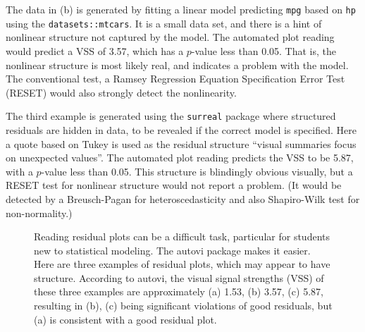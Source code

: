 \documentclass[
doublespace,
  times]{anzsauth}
\begin{document}
The data in (b) is generated by fitting a linear model predicting
\texttt{mpg} based on \texttt{hp} using the \texttt{datasets::mtcars}.
It is a small data set, and there is a hint of nonlinear structure not
captured by the model. The automated plot reading would predict a VSS of
3.57, which has a \(p\)-value less than 0.05. That is, the nonlinear
structure is most likely real, and indicates a problem with the model.
The conventional test, a Ramsey Regression Equation Specification Error
Test (RESET) \citep{ramsey1969tests} would also strongly detect the
nonlinearity.

The third example is generated using the \texttt{surreal} package
\citep{surreal} where structured residuals are hidden in data, to be
revealed if the correct model is specified. Here a quote based on Tukey
is used as the residual structure ``visual summaries focus on unexpected
values''. The automated plot reading predicts the VSS to be 5.87, with a
\(p\)-value less than 0.05. This structure is blindingly obvious
visually, but a RESET test for nonlinear structure would not report a
problem. (It would be detected by a Breusch-Pagan for heteroscedasticity
and also Shapiro-Wilk test \citep{shapiro1965analysis} for
non-normality.)

\begin{figure}


\caption{\label{fig-three-examples}Reading residual plots can be a
difficult task, particular for students new to statistical modeling. The
autovi package makes it easier. Here are three examples of residual
plots, which may appear to have structure. According to autovi, the
visual signal strengths (VSS) of these three examples are approximately
(a) 1.53, (b) 3.57, (c) 5.87, resulting in (b), (c) being significant
violations of good residuals, but (a) is consistent with a good residual
plot.}

\end{figure}%
\end{document}
